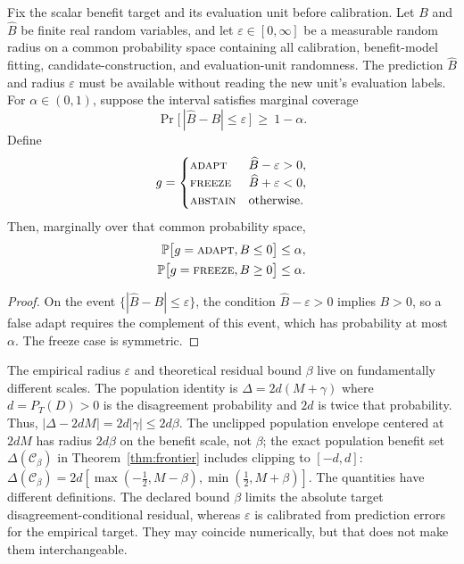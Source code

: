 \begin{proposition}\label{thm:certificate}\label{thm:cert}
Fix the scalar benefit target and its evaluation unit before calibration. Let $B$ and $\widehat B$
be finite real random variables, and let $\varepsilon\in[0,\infty]$ be a measurable random radius
on a common probability space containing all calibration, benefit-model fitting,
candidate-construction, and evaluation-unit randomness. The prediction $\widehat B$ and radius
$\varepsilon$ must be available without reading the new unit's evaluation labels. For
$\alpha\in(0,1)$, suppose the interval satisfies marginal coverage
\[
\Pr\!\bigl[\,|\widehat B-B|\le\varepsilon\,\bigr]\ \ge\ 1-\alpha .
\]
Define
\[
g=\begin{cases}
\textnormal{\textsc{adapt}} & \widehat B-\varepsilon>0,\\
\textnormal{\textsc{freeze}} & \widehat B+\varepsilon<0,\\
\textnormal{\textsc{abstain}} & \text{otherwise}.
\end{cases}
\]
Then, marginally over that common probability space,
\begin{align*}
\mathbb{P}\bigl[g=\textnormal{\textsc{adapt}},B\le0\bigr]&\le\alpha,\\
\mathbb{P}\bigl[g=\textnormal{\textsc{freeze}},B\ge0\bigr]&\le\alpha.
\end{align*}
\end{proposition}
\begin{proof}
On the event $\{|\widehat B-B|\le\varepsilon\}$, the condition
$\widehat B-\varepsilon>0$ implies $B>0$, so a false adapt requires the complement of
this event, which has probability at most $\alpha$. The freeze case is symmetric.
\end{proof}

\begin{remark}\label{rem:unit-scaling}
The empirical radius $\varepsilon$ and theoretical residual bound $\beta$ live on fundamentally
different scales. The population identity is $\Delta=2d(M+\gamma)$ where $d=P_T(D)>0$ is the
disagreement probability and $2d$ is twice that probability. Thus,
$|\Delta - 2dM| = 2d|\gamma| \le 2d\beta$. The unclipped population envelope centered at $2dM$
has radius $2d\beta$ on the benefit scale, not $\beta$; the exact population benefit set
$\Delta(\mathcal C_\beta)$ in Theorem~\ref{thm:frontier} includes clipping to $[-d, d]$:
$\Delta(\mathcal C_\beta) = 2d[\max(-\tfrac12, M-\beta), \min(\tfrac12, M+\beta)]$.
The quantities have different definitions. The declared bound $\beta$ limits the absolute target disagreement-conditional residual, whereas $\varepsilon$ is calibrated from prediction errors for the empirical target. They may coincide numerically, but that does not make them interchangeable.
\end{remark}

